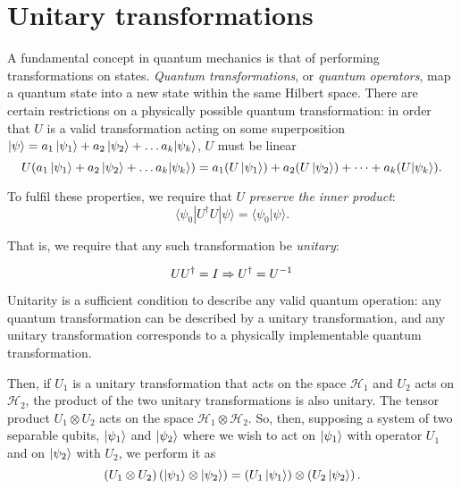 \section{Unitary transformations}\label{sec:unitary}
A fundamental concept in quantum mechanics is that of performing transformations on states. 
\emph{Quantum transformations}, or \emph{quantum operators}, map a quantum state into a new state within the same Hilbert space. 
There are certain restrictions on a physically possible quantum transformation: in order that $U$ is a valid transformation acting on some superposition $\ket{\psi} = a_1\ket{\psi_1} + a_2 \ket{\psi_2} + \dots a_k|\psi_k\rangle $, $U$ must be linear 
\begin{equation}
    U (  a_1\ket{\psi_1} + a_2 \ket{\psi_2} + \dots a_k|\psi_k\rangle ) =  a_1 (U\ket{\psi_1}) + a_2 (U\ket{\psi_2}) + \dots + a_k (U|\psi_k\rangle).
\end{equation}


To fulfil these properties, we require that $U$ \emph{preserve the inner product}:
$$ \langle \psi_0 | U^{\dag}U | \psi \rangle = \langle \psi_0 | \psi \rangle. $$

That is, we require that any such transformation be \emph{unitary}:

\begin{equation}  \label{unitary condition}
UU^{\dag} = I \\
\Rightarrow U^{\dag} = U^{-1}
\end{equation}

Unitarity is a sufficient condition to describe any valid quantum operation: any quantum transformation can be described by a unitary transformation, 
    and any unitary transformation corresponds to a physically implementable quantum transformation. %

Then, if $U_1$ is a unitary transformation that acts on the space $\mathcal{H}_1$ and $U_2$ acts on $\mathcal{H}_2$, the product of the two unitary transformations is also unitary. 
The tensor product $U_1 \otimes U_2$ acts on the space $\mathcal{H}_1 \otimes \mathcal{H}_2$. 
So, then, supposing a system of two separable qubits, $\ket{\psi_1} $ and $\ket{\psi_2} $ where we wish to act on $\ket{\psi_1} $ with operator $U_1$ and on $\ket{\psi_2} $ with $U_2$, 
    we perform it as
\begin{equation}
    \left( U_1 \otimes U_2 \right) \left(\ket{\psi_1} \otimes \ket{\psi_2} \right) = \left(U_1\ket{\psi_1}\right) \otimes \left(U_2 \ket{\psi_2}\right).
\end{equation}

